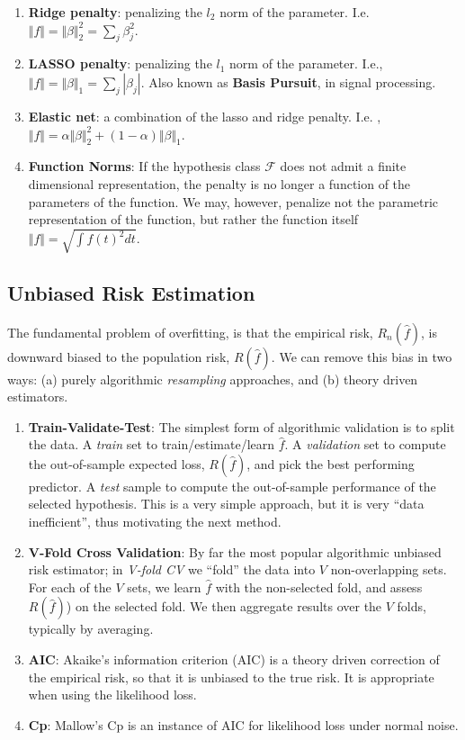 \documentclass[]{book}
\providecommand{\tightlist}{%
  \setlength{\itemsep}{0pt}\setlength{\parskip}{0pt}}
\theoremstyle{definition}
\theoremstyle{definition}
\theoremstyle{definition}
\theoremstyle{remark}
\begin{document}
\begin{enumerate}
\def\labelenumi{\arabic{enumi}.}
\tightlist
\item
  \textbf{Ridge penalty}: penalizing the \(l_2\) norm of the parameter. I.e. \(\Vert f \Vert=\Vert \beta \Vert_2^2=\sum_j \beta_j^2\).
\item
  \textbf{LASSO penalty}: penalizing the \(l_1\) norm of the parameter. I.e., \(\Vert f \Vert=\Vert \beta \Vert_1=\sum_j |\beta_j|\). Also known as \textbf{Basis Pursuit}, in signal processing.
\item
  \textbf{Elastic net}: a combination of the lasso and ridge penalty. I.e. ,\(\Vert f \Vert= \alpha \Vert \beta \Vert_2^2 + (1-\alpha) \Vert \beta \Vert_1\).
\item
  \textbf{Function Norms}: If the hypothesis class \(\mathcal{F}\) does not admit a finite dimensional representation, the penalty is no longer a function of the parameters of the function. We may, however, penalize not the parametric representation of the function, but rather the function itself \(\Vert f \Vert=\sqrt{\int f(t)^2 dt}\).
\end{enumerate}

\hypertarget{unbiased-risk-estimation}{%
\subsection{Unbiased Risk Estimation}\label{unbiased-risk-estimation}}

The fundamental problem of overfitting, is that the empirical risk, \(R_n(\hat f)\), is downward biased to the population risk, \(R(\hat f)\).
We can remove this bias in two ways:
(a) purely algorithmic \emph{resampling} approaches, and (b) theory driven estimators.

\begin{enumerate}
\def\labelenumi{\arabic{enumi}.}
\item
  \textbf{Train-Validate-Test}:
  The simplest form of algorithmic validation is to split the data.
  A \emph{train} set to train/estimate/learn \(\hat f\).
  A \emph{validation} set to compute the out-of-sample expected loss, \(R(\hat f)\), and pick the best performing predictor.
  A \emph{test} sample to compute the out-of-sample performance of the selected hypothesis.
  This is a very simple approach, but it is very ``data inefficient'', thus motivating the next method.
\item
  \textbf{V-Fold Cross Validation}:
  By far the most popular algorithmic unbiased risk estimator; in \emph{V-fold CV} we ``fold'' the data into \(V\) non-overlapping sets.
  For each of the \(V\) sets, we learn \(\hat f\) with the non-selected fold, and assess \(R(\hat f)\)) on the selected fold.
  We then aggregate results over the \(V\) folds, typically by averaging.
\item
  \textbf{AIC}:
  Akaike's information criterion (AIC) is a theory driven correction of the empirical risk, so that it is unbiased to the true risk.
  It is appropriate when using the likelihood loss.
\item
  \textbf{Cp}:
  Mallow's Cp is an instance of AIC for likelihood loss under normal noise.
\end{enumerate}
\end{document}
